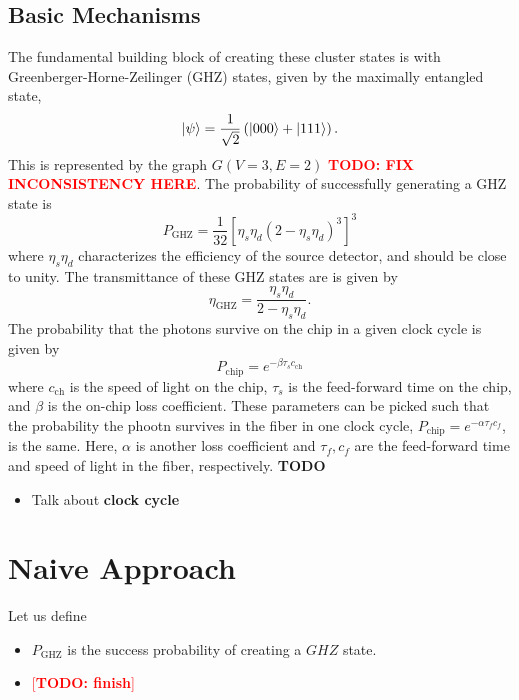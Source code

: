 \documentclass[%
 reprint,
 amsmath,amssymb
 aps,
]{revtex4}
\theoremstyle{remark}
\begin{document}
\subsection{Basic Mechanisms}
The fundamental building block of creating these cluster states is with Greenberger-Horne-Zeilinger (GHZ) states, given by the maximally entangled state,
\begin{equation}
    \ket{\psi} = \frac{1}{\sqrt{2}}\left(\ket{000}+\ket{111}\right).
\end{equation} 
This is represented by the graph $G(V=3,E=2)$ \textcolor{red}{\textbf{TODO: FIX INCONSISTENCY HERE}}. The probability of successfully generating a GHZ state is
\begin{equation}
    P_\text{GHZ} = \frac{1}{32}\left[\eta_s\eta_d(2-\eta_s\eta_d)^3\right]^3
\end{equation}
where $\eta_s\eta_d$ characterizes the efficiency of the source detector, and should be close to unity. The transmittance of these GHZ states are is given by 
\begin{equation}
    \eta_\text{GHZ} = \frac{\eta_s\eta_d}{2-\eta_s\eta_d}.
\end{equation}
The probability that the photons survive on the chip in a given clock cycle is given by
\begin{equation}
    P_\text{chip} = e^{-\beta\tau_sc_\text{ch}}
\end{equation}
where $c_\text{ch}$ is the speed of light on the chip, $\tau_s$ is the feed-forward time on the chip, and $\beta$ is the on-chip loss coefficient. These parameters can be picked such that the probability the phootn survives in the fiber in one clock cycle, $P_\text{chip} = e^{-\alpha \tau_f c_f}$, is the same. Here, $\alpha$ is another loss coefficient and $\tau_f,c_f$ are the feed-forward time and speed of light in the fiber, respectively.
\textbf{TODO}
\begin{itemize}
    \item Talk about \textbf{clock cycle}
\end{itemize}
\section{Naive Approach}
Let us define 
\begin{itemize}
    \item $P_\text{GHZ}$ is the success probability of creating a $GHZ$ state.
    \item \textcolor{red}{[\textbf{TODO: finish}]}
\end{itemize}
\end{document}
